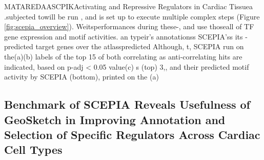 MATAREDAASCPIKActivating and Repressive Regulators in Cardiac Tissuea .subjected towill be run , and is set up to execute multiple complex steps (Figure \ref{fig:scepia_overview}). Weitsperformances during these-, and use thoseall  of TF gene expression and motif activities. an typeir's annotationss SCEPIA'ss its -predicted target genes over the atlasspredicted Although, t, SCEPIA run on the(a)(b)  labels of the top 15 of both correlating as anti-correlating hits are indicated, based on p-adj < 0.05 value(c) s (top) 3,, and their predicted motif activity by SCEPIA (bottom), printed on the (a)\subsection{Benchmark of SCEPIA Reveals Usefulness of GeoSketch in Improving Annotation and Selection of Specific Regulators Across Cardiac Cell Types}

\beginsupplement

